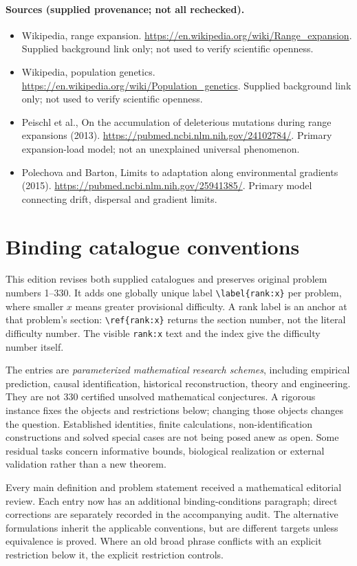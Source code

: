 \documentclass[11pt]{article}
\begin{document}
\paragraph{Sources (supplied provenance; not all rechecked).}
\begin{itemize}
\item Wikipedia, range expansion. \url{https://en.wikipedia.org/wiki/Range_expansion}. Supplied background link only; not used to verify scientific openness.
\item Wikipedia, population genetics. \url{https://en.wikipedia.org/wiki/Population_genetics}. Supplied background link only; not used to verify scientific openness.
\item Peischl et al., On the accumulation of deleterious mutations during range expansions (2013). \url{https://pubmed.ncbi.nlm.nih.gov/24102784/}. Primary expansion-load model; not an unexplained universal phenomenon.
\item Polechova and Barton, Limits to adaptation along environmental gradients (2015). \url{https://pubmed.ncbi.nlm.nih.gov/25941385/}. Primary model connecting drift, dispersal and gradient limits.
\end{itemize}


\section*{Binding catalogue conventions}
This edition revises both supplied catalogues and preserves original problem numbers 1--330. It adds one globally unique label \verb|\label{rank:x}| per problem, where smaller $x$ means greater provisional difficulty. A rank label is an anchor at that problem's section: \verb|\ref{rank:x}| returns the section number, not the literal difficulty number. The visible \texttt{rank:x} text and the index give the difficulty number itself.

The entries are \emph{parameterized mathematical research schemes}, including empirical prediction, causal identification, historical reconstruction, theory and engineering. They are not 330 certified unsolved mathematical conjectures. A rigorous instance fixes the objects and restrictions below; changing those objects changes the question. Established identities, finite calculations, non-identification constructions and solved special cases are not being posed anew as open. Some residual tasks concern informative bounds, biological realization or external validation rather than a new theorem.

Every main definition and problem statement received a mathematical editorial review. Each entry now has an additional binding-conditions paragraph; direct corrections are separately recorded in the accompanying audit. The alternative formulations inherit the applicable conventions, but are different targets unless equivalence is proved. Where an old broad phrase conflicts with an explicit restriction below it, the explicit restriction controls.
\end{document}

